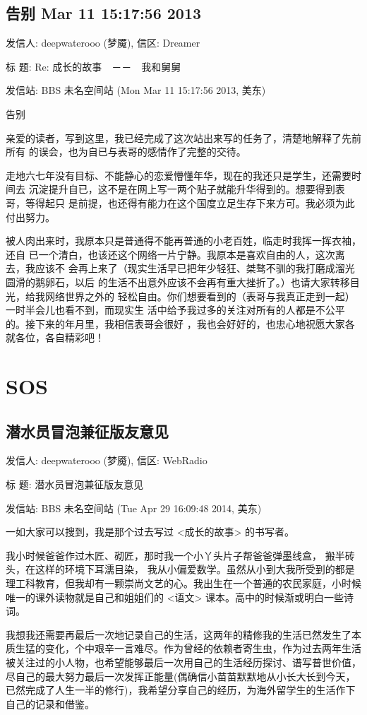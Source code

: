 \documentclass[12pt]{book}
\begin{document}
\section{告别 Mar 11 15:17:56 2013}
\label{sec-12-12}
发信人: deepwaterooo (梦魇), 信区: Dreamer

标  题: Re: 成长的故事　－－　我和舅舅

发信站: BBS 未名空间站 (Mon Mar 11 15:17:56 2013, 美东)

告别

亲爱的读者，写到这里，我已经完成了这次站出来写的任务了，清楚地解释了先前所有
的误会，也为自已与表哥的感情作了完整的交待。

走地六七年没有目标、不能静心的恋爱懵懂年华，现在的我还只是学生，还需要时间去
沉淀提升自已，这不是在网上写一两个贴子就能升华得到的。想要得到表哥，等得起只
是前提，也还得有能力在这个国度立足生存下来方可。我必须为此付出努力。

被人肉出来时，我原本只是普通得不能再普通的小老百姓，临走时我挥一挥衣袖，还自
已一个清白，也该还这个网络一片宁静。我原本是喜欢自由的人，这次离去，我应该不
会再上来了（现实生活早已把年少轻狂、桀骜不驯的我打磨成溜光圆滑的鹅卵石，以后
的生活不出意外应该不会再有重大挫折了。）也请大家转移目光，给我网络世界之外的
轻松自由。你们想要看到的（表哥与我真正走到一起）一时半会儿也看不到，而现实生
活中给予我过多的关注对所有的人都是不公平的。接下来的年月里，我相信表哥会很好
，我也会好好的，也忠心地祝愿大家各就各位，各自精彩吧！
\chapter{SOS}
\label{sec-13}
\section{潜水员冒泡兼征版友意见}
\label{sec-13-1}
发信人: deepwaterooo (梦魇), 信区: WebRadio

标  题: 潜水员冒泡兼征版友意见

发信站: BBS 未名空间站 (Tue Apr 29 16:09:48 2014, 美东)

一如大家可以搜到，我是那个过去写过 <成长的故事> 的书写者。

我小时候爸爸作过木匠、砌匠，那时我一个小丫头片子帮爸爸弹墨线盒， 搬半砖头，在这样的环境下耳濡目染， 我从小偏爱数学。虽然从小到大我所受到的都是理工科教育，但我却有一颗崇尚文艺的心。我出生在一个普通的农民家庭，小时候唯一的课外读物就是自己和姐姐们的 <语文> 课本。高中的时候渐或明白一些诗词。

我想我还需要再最后一次地记录自己的生活，这两年的精修我的生活已然发生了本质生猛的变化，个中艰辛一言难尽。作为曾经的依赖者寄生虫，作为过去两年生活被关注过的小人物，也希望能够最后一次用自己的生活经历探讨、谱写普世价值， 尽自己的最大努力最后一次发挥正能量(偶确信小苗苗默默地从小长大长到今天，已然完成了人生一半的修行)，我希望分享自己的经历，为海外留学生的生活作下自己的记录和借鉴。
\end{document}
